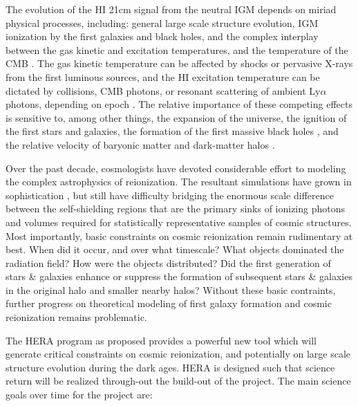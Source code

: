 \documentclass[preprint]{aastex}
\begin{document}
The evolution of the HI 21cm signal from the neutral IGM depends on miriad
physical processes, including: general large scale structure evolution, IGM
ionization by the first galaxies and black holes, and the complex interplay
between the gas kinetic and excitation temperatures, and the temperature of the
CMB \citep{furlanetto_et_al2006}. The gas kinetic temperature can be affected
by shocks or pervasive X-rays from the first luminous sources, and the HI
excitation temperature can be dictated by collisions, CMB photons, or resonant
scattering of ambient Ly$\alpha$ photons, depending on epoch
\citep{pritchard_loeb2012}.  The relative importance of these competing effects
is sensitive to, among other things, the expansion of the universe, the
ignition of the first stars and galaxies, the formation of the first massive
black holes \citep{mesinger_et_al2013}, and the relative velocity of baryonic
matter and dark-matter halos \citep{mcquinn_oleary2012}.  

Over the past decade, cosmologists have devoted considerable effort to modeling the complex astrophysics of reionization. The resultant simulations have grown in
sophistication \citep{santos_et_al2010,mesinger_et_al2011,wyithe_loeb2004}, but still 
have difficulty bridging the enormous scale difference between the self-shielding
regions that are the primary sinks of ionizing photons and volumes required for statistically
representative samples of cosmic structures.
Most importantly, basic constraints on cosmic reionization remain rudimentary at best. When did it occur, and over what timescale?  What objects dominated the radiation field? How were the objects distributed? Did the first generation of stars \& galaxies enhance or suppress the formation of subsequent stars \& galaxies in the original halo and smaller nearby halos? Without these basic contraints, 
further progress on theoretical modeling of first galaxy formation and cosmic reionization remains problematic. 

The HERA program as proposed provides a powerful new tool which will generate critical constraints on cosmic reionization, and potentially on large scale structure evolution during the dark ages. HERA is designed such that science return will be realized through-out the build-out of the project. The main science goals over time for the project are:

\end{document}
